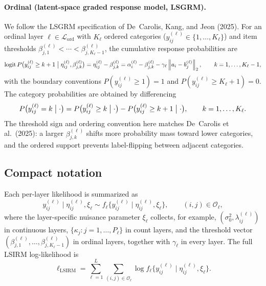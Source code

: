 \documentclass[11pt]{article}
\newcommand{\norm}[1]{\left\lVert #1 \right\rVert}
\DeclareMathOperator{\logit}{logit}
\begin{document}
\paragraph{Ordinal (latent-space graded response model, LSGRM).}
We follow the LSGRM specification of De~Carolis, Kang, and Jeon (2025).  For
an ordinal layer $\ell\in\mathcal L_{\mathrm{ord}}$ with $K_\ell$ ordered
categories ($y_{ij}^{(\ell)}\in\{1,\dots,K_\ell\}$) and item thresholds
$\beta_{j,1}^{(\ell)}<\cdots<\beta_{j,K_\ell-1}^{(\ell)}$, the cumulative
response probabilities are
\begin{equation}
    \logit
    P\bigl(y_{ij}^{(\ell)}\geq k+1\bigm|\eta_{ij}^{(\ell)},\beta_{j,k}^{(\ell)}\bigr)
    =
    \eta_{ij}^{(\ell)}-\beta_{j,k}^{(\ell)}
    =
    \alpha_i^{(\ell)}-\beta_{j,k}^{(\ell)}-\gamma_\ell\norm{a_i-b_j^{(\ell)}}_2,
    \qquad k=1,\dots,K_\ell-1,
    \label{eq:lik-ordinal-cumulative}
\end{equation}
with the boundary conventions $P(y_{ij}^{(\ell)}\geq 1)=1$ and
$P(y_{ij}^{(\ell)}\geq K_\ell+1)=0$.  The category probabilities are obtained
by differencing
\begin{equation}
    P\bigl(y_{ij}^{(\ell)}=k\bigm|\cdot\bigr)
    =
    P\bigl(y_{ij}^{(\ell)}\geq k\bigm|\cdot\bigr)
    -P\bigl(y_{ij}^{(\ell)}\geq k+1\bigm|\cdot\bigr),
    \qquad k=1,\dots,K_\ell.
    \label{eq:lik-ordinal}
\end{equation}
The threshold sign and ordering convention here matches De~Carolis et al.\
(2025): a larger $\beta_{j,k}^{(\ell)}$ shifts more probability mass toward
lower categories, and the ordered support prevents label-flipping between
adjacent categories.

\subsection{Compact notation}

Each per-layer likelihood is summarized as
\begin{equation}
    y_{ij}^{(\ell)}\mid \eta_{ij}^{(\ell)},\xi_\ell
    \sim f_\ell\bigl\{y_{ij}^{(\ell)}\mid \eta_{ij}^{(\ell)},\xi_\ell\bigr\},
    \qquad (i,j)\in\mathcal O_\ell,
    \label{eq:generic-layer-likelihood}
\end{equation}
where the layer-specific nuisance parameter $\xi_\ell$ collects, for example,
$(\sigma_0^2,\lambda_{ij}^{(\ell)})$ in continuous layers,
$\{\kappa_j:j=1,\dots,P_\ell\}$ in count layers, and the threshold vector
$(\beta_{j,1}^{(\ell)},\dots,\beta_{j,K_\ell-1}^{(\ell)})$ in ordinal layers,
together with $\gamma_\ell$ in every layer.  The full LSIRM log-likelihood is
\begin{equation}
    \ell_{\mathrm{LSIRM}}
    =
    \sum_{\ell=1}^L
    \sum_{(i,j)\in\mathcal O_\ell}
    \log f_\ell\bigl\{y_{ij}^{(\ell)}\mid \eta_{ij}^{(\ell)},\xi_\ell\bigr\}.
    \label{eq:lsirm-loglik}
\end{equation}
\end{document}
